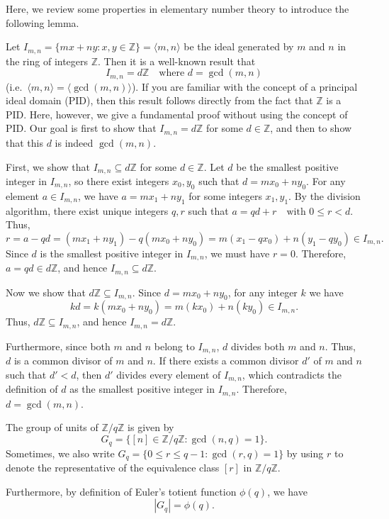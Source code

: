 \documentclass{elegantbook}
\begin{document}
\begin{example} \label{ex:gcd_ideal}
  Here, we review some properties in elementary number theory to introduce the following lemma.

  Let $I_{m,n}=\{mx+ny : x,y\in\mathbb{Z}\}=\langle m,n\rangle$ be the ideal generated by $m$ and $n$ in the ring of integers $\mathbb{Z}$. Then it is a well-known result that
  \[
    I_{m,n}=d\mathbb{Z} \quad \text{where } d=\gcd(m,n)
  \]
  (i.e.\ $\langle m,n\rangle=\langle \gcd(m,n)\rangle$). If you are familiar with the concept of a principal ideal domain (PID), then this result follows directly from the fact that $\mathbb{Z}$ is a PID. Here, however, we give a fundamental proof without using the concept of PID. Our goal is first to show that $I_{m,n}=d\mathbb{Z}$ for some $d\in\mathbb{Z}$, and then to show that this $d$ is indeed $\gcd(m,n)$.

  First, we show that $I_{m,n}\subseteq d\mathbb{Z}$ for some $d\in\mathbb{Z}$. Let $d$ be the smallest positive integer in $I_{m,n}$, so there exist integers $x_0,y_0$ such that $ d=mx_0+ny_0.$
  For any element $a\in I_{m,n}$, we have $a=mx_1+ny_1$ for some integers $x_1,y_1$. By the division algorithm, there exist unique integers $q,r$ such that $ a=qd+r \quad \text{with } 0\le r<d.$
  Thus,
  \[
    r=a-qd=(mx_1+ny_1)-q(mx_0+ny_0) =m(x_1-qx_0)+n(y_1-qy_0)\in I_{m,n}.
  \]
  Since $d$ is the smallest positive integer in $I_{m,n}$, we must have $r=0$. Therefore, $a=qd\in d\mathbb{Z}$, and hence $I_{m,n}\subseteq d\mathbb{Z}$.

  Now we show that $d\mathbb{Z}\subseteq I_{m,n}$. Since $d=mx_0+ny_0$, for any integer $k$ we have
  \[
    kd=k(mx_0+ny_0)=m(kx_0)+n(ky_0)\in I_{m,n}.
  \]
  Thus, $d\mathbb{Z}\subseteq I_{m,n}$, and hence $I_{m,n}=d\mathbb{Z}$.

  Furthermore, since both $m$ and $n$ belong to $I_{m,n}$, $d$ divides both $m$ and $n$. Thus, $d$ is a common divisor of $m$ and $n$. If there exists a common divisor $d'$ of $m$ and $n$ such that $d'<d$, then $d'$ divides every element of $I_{m,n}$, which contradicts the definition of $d$ as the smallest positive integer in $I_{m,n}$. Therefore, $d=\gcd(m,n).$
\end{example}

\begin{lemma}
  The group of units of $\mathbb{Z}/q\mathbb{Z}$ is given by
  \[
    G_q = \{ [n] \in \mathbb{Z}/q\mathbb{Z} : \gcd(n,q) = 1 \}.
  \]
  Sometimes, we also write $G_q = \{ 0 \leq r \leq q-1 : \gcd(r,q) = 1 \}$ by using $r$ to denote the representative of the equivalence class $[r]$ in $\mathbb{Z}/q\mathbb{Z}$.

  Furthermore, by definition of Euler's totient function $\phi(q)$, we have
  \[
    |G_q| = \phi(q).
  \]
\end{lemma}
\end{document}
